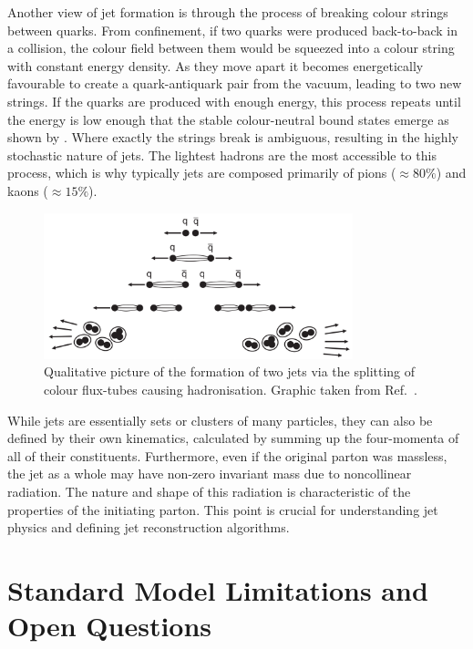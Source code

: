 Another view of jet formation is through the process of breaking colour strings between quarks.
From confinement, if two quarks were produced back-to-back in a collision, the colour field between them would be squeezed into a colour string with constant energy density.
As they move apart it becomes energetically favourable to create a quark-antiquark pair from the vacuum, leading to two new strings.
If the quarks are produced with enough energy, this process repeats until the energy is low enough that the stable colour-neutral bound states emerge as shown by .
Where exactly the strings break is ambiguous, resulting in the highly stochastic nature of jets.
The lightest hadrons are the most accessible to this process, which is why typically jets are composed primarily of pions ($\approx80\%$) and kaons ($\approx15\%$).

\begin{figure}[h]
    \centering
    \includegraphics[width=0.8\textwidth]{Figures/standard_model/hadronisation.png}
    \caption{Qualitative picture of the formation of two jets via the splitting of colour flux-tubes causing hadronisation. Graphic taken from Ref.~\cite{ModernParticlePhysics}.}
    \label{fig:hadronisation}
\end{figure}

While jets are essentially sets or clusters of many particles, they can also be defined by their own kinematics, calculated by summing up the four-momenta of all of their constituents.
Furthermore, even if the original parton was massless, the jet as a whole may have non-zero invariant mass due to noncollinear radiation.
The nature and shape of this radiation is characteristic of the properties of the initiating parton.
This point is crucial for understanding jet physics and defining jet reconstruction algorithms.

\section{Standard Model Limitations and Open Questions}
\label{sec:sm_limitations}

